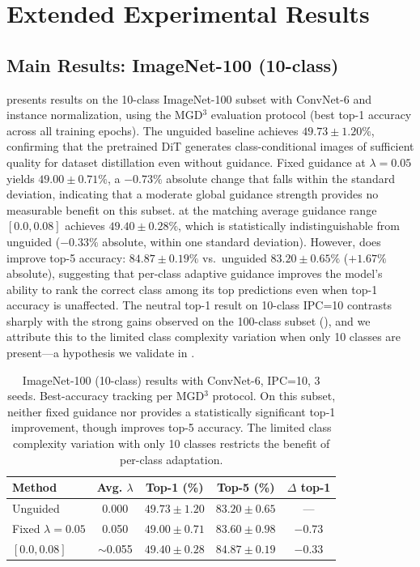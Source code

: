 \section{Extended Experimental Results}
\label{sec:extended-results}

\subsection{Main Results: ImageNet-100 (10-class)}
\label{sec:results-10cls}

 presents results on the 10-class ImageNet-100 subset with ConvNet-6 and instance normalization, using the MGD$^3$ evaluation protocol (best top-1 accuracy across all training epochs). The unguided baseline achieves $49.73 \pm 1.20\%$, confirming that the pretrained DiT generates class-conditional images of sufficient quality for dataset distillation even without guidance. Fixed guidance at $\lambda = 0.05$ yields $49.00 \pm 0.71\%$, a $-0.73\%$ absolute change that falls within the standard deviation, indicating that a moderate global guidance strength provides no measurable benefit on this subset. \cags{} at the matching average guidance range $[0.0, 0.08]$ achieves $49.40 \pm 0.28\%$, which is statistically indistinguishable from unguided ($-0.33\%$ absolute, within one standard deviation). However, \cags{} does improve top-5 accuracy: $84.87 \pm 0.19\%$ vs.\ unguided $83.20 \pm 0.65\%$ ($+1.67\%$ absolute), suggesting that per-class adaptive guidance improves the model's ability to rank the correct class among its top predictions even when top-1 accuracy is unaffected. The neutral top-1 result on 10-class IPC=10 contrasts sharply with the strong gains observed on the 100-class subset (), and we attribute this to the limited class complexity variation when only 10 classes are present---a hypothesis we validate in .

\begin{table}[t]
\centering
\caption{ImageNet-100 (10-class) results with ConvNet-6, IPC=10, 3 seeds. Best-accuracy tracking per MGD$^3$ protocol. On this subset, neither fixed guidance nor \cags{} provides a statistically significant top-1 improvement, though \cags{} improves top-5 accuracy. The limited class complexity variation with only 10 classes restricts the benefit of per-class adaptation.}
\label{tab:results-10cls}
\begin{tabular}{lcccc}
\toprule
\textbf{Method} & \textbf{Avg. $\lambda$} & \textbf{Top-1 (\%)} & \textbf{Top-5 (\%)} & \textbf{$\Delta$ top-1} \\
\midrule
Unguided & 0.000 & $49.73 \pm 1.20$ & $83.20 \pm 0.65$ & --- \\
Fixed $\lambda = 0.05$ & 0.050 & $49.00 \pm 0.71$ & $83.60 \pm 0.98$ & $-0.73$ \\
\midrule
\cags{} $[0.0, 0.08]$ & $\sim$0.055 & $49.40 \pm 0.28$ & $\mathbf{84.87 \pm 0.19}$ & $-0.33$ \\
\bottomrule
\end{tabular}
\end{table}

